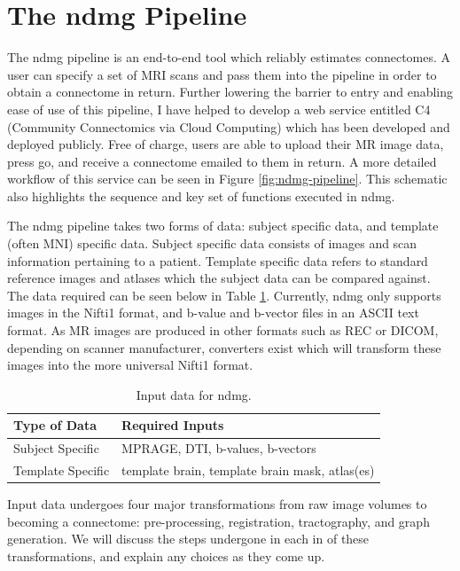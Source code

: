 \section{The ndmg Pipeline}
\label{sec:pipeline}
The ndmg pipeline is an end-to-end tool which reliably estimates connectomes. A user can specify a set of MRI scans and pass them into the pipeline in order to obtain a connectome in return. Further lowering the barrier to entry and enabling ease of use of this pipeline, I have helped to develop a web service entitled C4 (Community Connectomics via Cloud Computing) which has been developed and deployed publicly. Free of charge, users are able to upload their MR image data, press go, and receive a connectome emailed to them in return. A more detailed workflow of this service can be seen in Figure \ref{fig:ndmg-pipeline}. This schematic also highlights the sequence and key set of functions executed in ndmg.

The ndmg pipeline takes two forms of data: subject specific data, and template (often MNI) specific data. Subject specific data consists of images and scan information pertaining to a patient. Template specific data refers to standard reference images and atlases which the subject data can be compared against. The data required can be seen below in Table \ref{tab:datafiles}. Currently, ndmg only supports images in the Nifti1 \cite{nifti} format, and b-value and b-vector files in an ASCII text format. As MR images are produced in other formats such as REC or DICOM, depending on scanner manufacturer, converters exist which will transform these images into the more universal Nifti1 format.
\begin{table}[h!]
\centering
\begin{tabular}{| l | l |}
\hline
\textbf{Type of Data}	& \textbf{Required Inputs} \\ \hline \hline
Subject Specific & MPRAGE, DTI, b-values, b-vectors \\ \hline
Template Specific& template brain, template brain mask, atlas(es)\\ \hline
\end{tabular}
\makeatletter
\let\@currsize\normalsize
\caption{Input data for ndmg.}
\label{tab:datafiles}
\end{table}

Input data undergoes four major transformations from raw image volumes to becoming a connectome: pre-processing, registration, tractography, and graph generation. We will discuss the steps undergone in each in of these transformations, and explain any choices as they come up.

